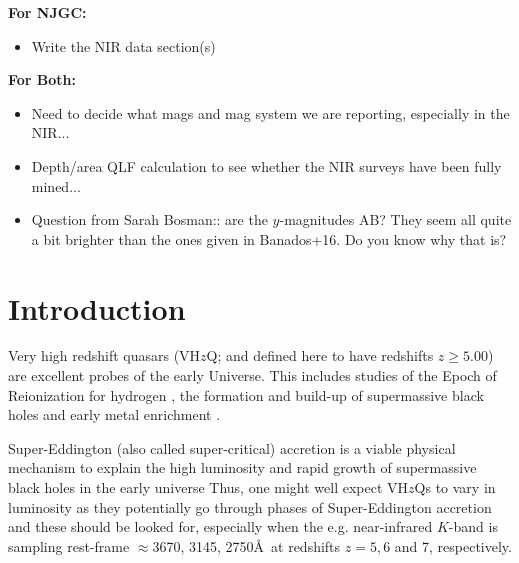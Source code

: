 \documentclass[usenatbib]{mnras}
\begin{document}
\noindent
{\bf For NJGC: }
\begin{itemize}
\item Write the NIR data section(s) 
\end{itemize}

\noindent
{\bf For Both: }
\begin{itemize}
\item Need to decide what mags and mag system we are reporting, especially in the 
NIR...
\item Depth/area QLF calculation to see whether the NIR surveys have been fully mined...
\item Question from Sarah Bosman:: are the $y$-magnitudes AB? They seem all quite a bit brighter than the ones given in Banados+16. Do you know why that is?
\end{itemize}
\fi


\section{Introduction}
Very high redshift quasars (VH$z$Q; and defined here to have redshifts
$z\geq5.00$) are excellent probes of the early Universe. This includes
studies of the Epoch of Reionization for hydrogen \citep[see e.g.][for
reviews]{Fan2006review, Mortlock2016}, the formation and build-up of
supermassive black holes \citep[e.g., ][]{Rees1984, WyitheLoeb2003,
Volonteri2010, Agarwal2016, Valiante2018, Latif2018} and early metal
enrichment \citep[see e.g., ][]{Simcoe2012, Chen2017, Bosman2017}.

Super-Eddington (also called super-critical) accretion is a viable
physical mechanism to explain the high luminosity and rapid growth of
supermassive black holes in the early universe
\citep[e.g.,][]{AlexanderNatarajan2014, MadauHaardtDotti2014,
Volonteri2015, Pezzulli2016, Lupi2016} Thus, one might well expect
VH$z$Qs to vary in luminosity as they potentially go through phases of
Super-Eddington accretion and these should be looked for, especially
when the e.g.  near-infrared $K$-band is sampling rest-frame
$\approx$3670, 3145, 2750\AA\ at redshifts $z=5, 6$ and 7,
respectively.
\end{document}
